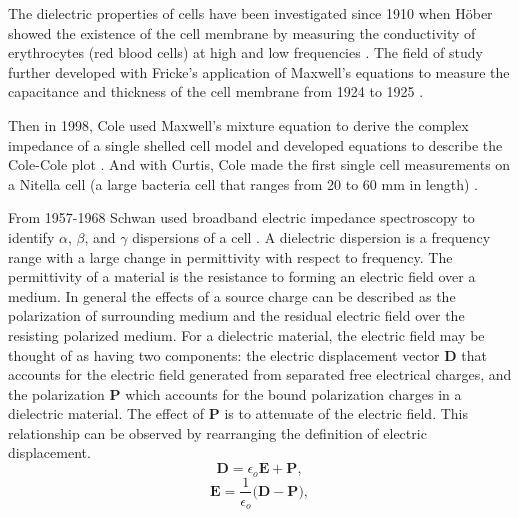  
 \par The dielectric properties of cells have been investigated since 1910 when H\"{o}ber showed the existence of the cell membrane by measuring the conductivity of erythrocytes (red blood cells) at high and low frequencies \cite{hober_r_methode_1910}. The field of study further developed with Fricke's application of Maxwell's equations to measure the capacitance and thickness of the cell membrane from 1924 to 1925 \cite{james_clerk_maxwell_treatise_1892, fricke_h_mathematical_1924, fricke_h_electric_1924, fricke_h_electric_1931}. 
 
 \par Then in 1998, Cole used Maxwell's mixture equation to derive the complex impedance of a single shelled cell model and developed equations to describe the Cole-Cole plot \cite{cole_electric_1928}. And with Curtis, Cole made the first single cell measurements on a Nitella cell (a large bacteria cell that ranges from 20 to 60 mm in length) \cite{curtis_transverse_1937}. 
 
 \par From 1957-1968 Schwan used broadband electric impedance spectroscopy to identify $\alpha$, $\beta$, and $\gamma$ dispersions of a cell \cite{schwan_h_p_electrical_1957,schwan_h_p_electrical_1963,schwan_electrical_1994}. A dielectric dispersion is a frequency range with a large change in permittivity with respect to frequency. The permittivity of a material is the resistance to forming an electric field over a medium. In general the effects of a source charge can be described as the polarization of surrounding medium and the residual electric field over the resisting polarized medium. For a dielectric material, the electric field may be thought of as having two components: the electric displacement vector $\boldsymbol{D}$ that accounts for the electric field generated from separated free electrical charges, and the polarization $\boldsymbol{P}$ which accounts for the bound polarization charges in a dielectric material. The effect of $\boldsymbol{P}$ is to attenuate of the electric field. This relationship can be observed by rearranging the definition of electric displacement.
 \begin{equation}
     \boldsymbol{D} = \epsilon_o \boldsymbol{E} + \boldsymbol{P},
     \label{eqn:electric_displacement}
 \end{equation}
 \begin{equation}
    \boldsymbol{E} = \frac{1}{\epsilon_o}\Big(\boldsymbol{D} - \boldsymbol{P}\Big),
 \end{equation}
 
